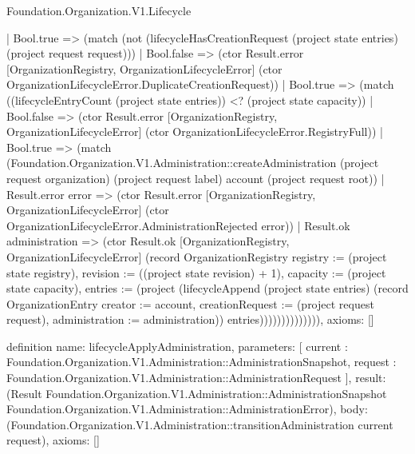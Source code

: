 \begin{lexlean}{Foundation.Organization.V1.Lifecycle}
\begin{semanticmodule}
{                  | Bool.true => (match (not (lifecycleHasCreationRequest (project state entries) (project request request)))
                    | Bool.false => (ctor Result.error [OrganizationRegistry, OrganizationLifecycleError] (ctor OrganizationLifecycleError.DuplicateCreationRequest))
                    | Bool.true => (match ((lifecycleEntryCount (project state entries)) <? (project state capacity))
                      | Bool.false => (ctor Result.error [OrganizationRegistry, OrganizationLifecycleError] (ctor OrganizationLifecycleError.RegistryFull))
                      | Bool.true => (match (Foundation.Organization.V1.Administration::createAdministration (project request organization) (project request label) account (project request root))
                        | Result.error error => (ctor Result.error [OrganizationRegistry, OrganizationLifecycleError] (ctor OrganizationLifecycleError.AdministrationRejected error))
                        | Result.ok administration => (ctor Result.ok [OrganizationRegistry, OrganizationLifecycleError] (record OrganizationRegistry {registry := (project state registry), revision := ((project state revision) + 1), capacity := (project state capacity), entries := (project (lifecycleAppend (project state entries) (record OrganizationEntry {creator := account, creationRequest := (project request request), administration := administration})) entries)}))))))))))))),
  axioms: []
}

definition{
  name: lifecycleApplyAdministration,
  parameters: [
    current : Foundation.Organization.V1.Administration::AdministrationSnapshot,
    request : Foundation.Organization.V1.Administration::AdministrationRequest
  ],
  result: (Result Foundation.Organization.V1.Administration::AdministrationSnapshot Foundation.Organization.V1.Administration::AdministrationError),
  body: (Foundation.Organization.V1.Administration::transitionAdministration current request),
  axioms: []
}


\end{semanticmodule}
\end{lexlean}

